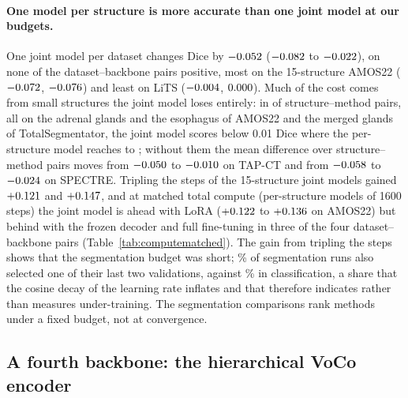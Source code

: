 \paragraph{One model per structure is more accurate than one joint model at our budgets.} One joint model per dataset changes Dice by $-0.052$ ($-0.082$ to $-0.022$), on none of the \numCiSegjointAllClustersN{} dataset--backbone pairs positive, most on the 15-structure AMOS22 ($-0.072$, $-0.076$) and least on LiTS ($-0.004$, $0.000$). Much of the cost comes from small structures the joint model loses entirely: in \numSegcollapseN{} of \numSegcollapseCellsN{} structure--method pairs, all on the adrenal glands and the esophagus of AMOS22 and the merged glands of TotalSegmentator, the joint model scores below 0.01 Dice where the per-structure model reaches \numSegcollapsePertaskminValue{} to \numSegcollapsePertaskmaxValue{}; without them the mean difference over structure--method pairs moves from $-0.050$ to $-0.010$ on TAP-CT and from $-0.058$ to $-0.024$ on SPECTRE. Tripling the steps of the 15-structure joint models gained $+0.121$ and $+0.147$, and at matched total compute (per-structure models of 1600 steps) the joint model is ahead with LoRA ($+0.122$ to $+0.136$ on AMOS22) but behind with the frozen decoder and full fine-tuning in three of the four dataset--backbone pairs (Table~\ref{tab:computematched}). The gain from tripling the steps shows that the segmentation budget was short; \numConvSegAllLateBetter\% of segmentation runs also selected one of their last two validations, against \numConvClsAllLateBetter\% in classification, a share that the cosine decay of the learning rate inflates and that therefore indicates rather than measures under-training. The segmentation comparisons rank methods under a fixed budget, not at convergence.

\subsection{A fourth backbone: the hierarchical VoCo encoder}
\label{sec:voco}

